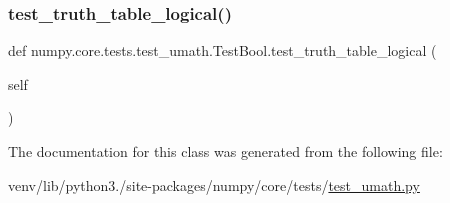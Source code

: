 \subsubsection{\texorpdfstring{test\+\_\+truth\+\_\+table\+\_\+logical()}{test\_truth\_table\_logical()}}
{\footnotesize\ttfamily def numpy.\+core.\+tests.\+test\+\_\+umath.\+Test\+Bool.\+test\+\_\+truth\+\_\+table\+\_\+logical (\begin{DoxyParamCaption}\item[{}]{self }\end{DoxyParamCaption})}



The documentation for this class was generated from the following file\+:\begin{DoxyCompactItemize}
\item 
venv/lib/python3./site-\/packages/numpy/core/tests/\hyperlink{test__umath_8py}{test\+\_\+umath.\+py}\end{DoxyCompactItemize}

